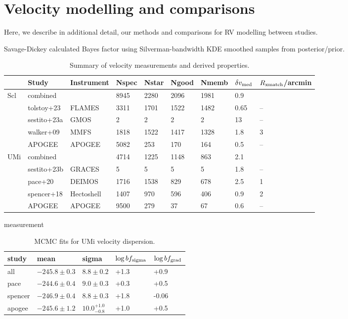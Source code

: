 \section{Velocity modelling and
comparisons}\label{velocity-modelling-and-comparisons}

Here, we describe in additional detail, our methods and comparisons for
RV modelling between studies.

Savage-Dickey calculated Bayes factor using Silverman-bandwidth KDE
smoothed samples from posterior/prior.

\begin{table*}[t]
\centering
\caption[Spectroscopic LOS velocity measurements]{Summary of velocity measurements and derived properties. }
\label{tbl:rv_measurements}
\begin{tabular}{lllllllll}
\toprule
 & Study & Instrument & Nspec & Nstar & Ngood & Nmemb & $\delta v_{\rm med}$ & $R_{\rm xmatch}$/arcmin\\
\midrule
Scl & combined &  & 8945 & 2280 & 2096 & 1981 & 0.9 & \\
 & tolstoy+23 & FLAMES & 3311 & 1701 & 1522 & 1482 & 0.65 & –\\
 & sestito+23a & GMOS & 2 & 2 & 2 & 2 & 13 & –\\
 & walker+09 & MMFS & 1818 & 1522 & 1417 & 1328 & 1.8 & 3\\
 & APOGEE & APOGEE & 5082 & 253 & 170 & 164 & 0.5 & –\\
UMi & combined &  & 4714 & 1225 & 1148 & 863 & 2.1 & \\
 & sestito+23b & GRACES & 5 & 5 & 5 & 5 & 1.8 & –\\
 & pace+20 & DEIMOS & 1716 & 1538 & 829 & 678 & 2.5 & 1\\
 & spencer+18 & Hectoshell & 1407 & 970 & 596 & 406 & 0.9 & 2\\
 & APOGEE & APOGEE & 9500 & 279 & 37 & 67 & 0.6 & –\\
\bottomrule
\end{tabular}
\end{table*}

measurement

\begin{table*}[t]
\centering
\caption[Ursa Minor RV fits]{MCMC fits for UMi velocity dispersion. }
\label{tbl:umi_rv_mcmc}
\begin{tabular}{lllll}
\toprule
study & mean & sigma & $\log bf_{\rm sigma}$ & $\log bf_{\rm grad}$\\
\midrule
all & $-245.8\pm0.3$ & $8.8\pm0.2$ & +1.3 & +0.9\\
pace & $-244.6\pm0.4$ & $9.0\pm0.3$ & +0.3 & +0.5\\
spencer & $-246.9\pm0.4$ & $8.8\pm0.3$ & +1.8 & -0.06\\
apogee & $-245.6\pm1.2$ & $10.0_{-0.8}^{+1.0}$ & +1.0 & +0.5\\
\bottomrule
\end{tabular}
\end{table*}

